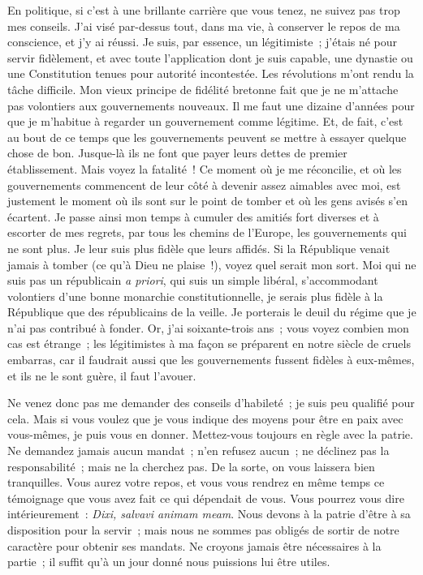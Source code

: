 \documentclass[french,twoside]{book} %
\newcommand\foreign[1]{\emph{#1}}
\newcommand\placeName[1]{#1}
\begin{document}
En politique, si c’est à une brillante carrière que vous tenez, ne suivez pas trop mes conseils. J’ai visé par-dessus tout, dans ma vie, à conserver le repos de ma conscience, et j’y ai réussi. Je suis, par essence, un légitimiste ; j’étais né pour servir fidèlement, et avec toute l’application dont je suis capable, une dynastie ou une Constitution tenues pour autorité incontestée. Les révolutions m’ont rendu la tâche difficile. Mon vieux principe de fidélité bretonne fait que je ne m’attache pas volontiers aux gouvernements nouveaux. Il me faut une dizaine d’années pour que je m’habitue à regarder un gouvernement comme légitime. Et, de fait, c’est au bout de ce temps que les gouvernements peuvent se mettre à essayer quelque chose de bon. Jusque-là ils ne font que payer leurs dettes de premier établissement. Mais voyez la fatalité ! Ce moment où je me réconcilie, et où les gouvernements commencent de leur côté à devenir assez aimables avec moi, est justement le moment où ils sont sur le point de tomber et où les gens avisés s’en écartent. Je passe ainsi mon temps à cumuler des amitiés fort diverses et à escorter de mes regrets, par tous les chemins de l’{\placeName Europe}, les gouvernements qui ne sont plus. Je leur suis plus fidèle que leurs affidés. Si la République venait jamais à tomber (ce qu’à Dieu ne plaise !), voyez quel serait mon sort. Moi qui ne suis pas un républicain {\itshape a priori}, qui suis un simple libéral, s’accommodant volontiers d’une bonne monarchie constitutionnelle, je serais plus fidèle à la République que des républicains de la veille. Je porterais le deuil du régime que je n’ai pas contribué à fonder. Or, j’ai soixante-trois ans ; vous voyez combien mon cas est étrange ; les légitimistes à ma façon se préparent en notre siècle de cruels embarras, car il faudrait aussi que les gouvernements fussent fidèles à eux-mêmes, et ils ne le sont guère, il faut l’avouer.\par
Ne venez donc pas me demander des conseils d’habileté ; je suis peu qualifié pour cela. Mais si vous voulez que je vous indique des moyens pour être en paix avec vous-mêmes, je puis vous en donner. Mettez-vous toujours en règle avec la patrie. Ne demandez jamais aucun mandat ; n’en refusez aucun ; ne déclinez pas la responsabilité ; mais ne la cherchez pas. De la sorte, on vous laissera bien tranquilles. Vous aurez votre repos, et vous vous rendrez en même temps ce témoignage que vous avez fait ce qui dépendait de vous. Vous pourrez vous dire intérieurement : \foreign{{\itshape Dixi, salvavi animam meam}}. Nous devons à la patrie d’être à sa disposition pour la servir ; mais nous ne sommes pas obligés de sortir de notre caractère pour obtenir ses mandats. Ne croyons jamais être nécessaires à la partie ; il suffit qu’à un jour donné nous puissions lui être utiles.\par
\end{document}
